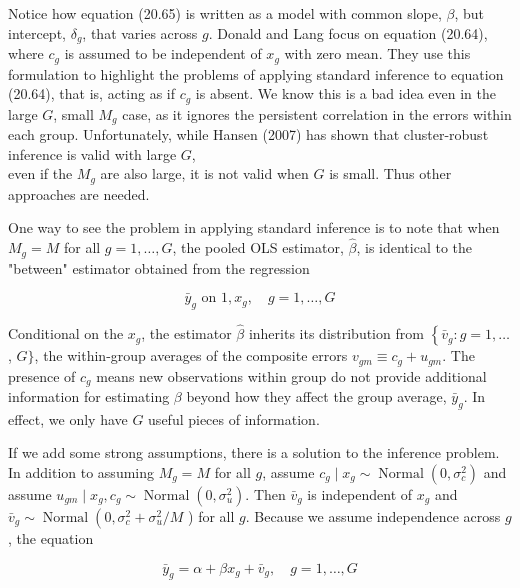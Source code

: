 \documentclass[10pt]{article}
\begin{document}
Notice how equation (20.65) is written as a model with common slope, $\beta$, but intercept, $\delta_{g}$, that varies across $g$. Donald and Lang focus on equation (20.64), where $c_{g}$ is assumed to be independent of $x_{g}$ with zero mean. They use this formulation to highlight the problems of applying standard inference to equation (20.64), that is, acting as if $c_{g}$ is absent. We know this is a bad idea even in the large $G$, small $M_{g}$ case, as it ignores the persistent correlation in the errors within each group. Unfortunately, while Hansen (2007) has shown that cluster-robust inference is valid with large $G$,\\
even if the $M_{g}$ are also large, it is not valid when $G$ is small. Thus other approaches are needed.

One way to see the problem in applying standard inference is to note that when $M_{g}=M$ for all $g=1, \ldots, G$, the pooled OLS estimator, $\hat{\beta}$, is identical to the "between" estimator obtained from the regression


\begin{equation*}
\bar{y}_{g} \text { on } 1, x_{g}, \quad g=1, \ldots, G \tag{20.66}
\end{equation*}


Conditional on the $x_{g}$, the estimator $\hat{\beta}$ inherits its distribution from $\left\{\bar{v}_{g}: g=1, \ldots\right.$, $G\}$, the within-group averages of the composite errors $v_{g m} \equiv c_{g}+u_{g m}$. The presence of $c_{g}$ means new observations within group do not provide additional information for estimating $\beta$ beyond how they affect the group average, $\bar{y}_{g}$. In effect, we only have $G$ useful pieces of information.

If we add some strong assumptions, there is a solution to the inference problem. In addition to assuming $M_{g}=M$ for all $g$, assume $c_{g} \mid x_{g} \sim \operatorname{Normal}\left(0, \sigma_{c}^{2}\right)$ and assume $u_{g m} \mid x_{g}, c_{g} \sim \operatorname{Normal}\left(0, \sigma_{u}^{2}\right)$. Then $\bar{v}_{g}$ is independent of $x_{g}$ and $\bar{v}_{g} \sim \operatorname{Normal}\left(0, \sigma_{c}^{2}+\right. \sigma_{u}^{2} / M$ ) for all $g$. Because we assume independence across $g$, the equation


\begin{equation*}
\bar{y}_{g}=\alpha+\beta x_{g}+\bar{v}_{g}, \quad g=1, \ldots, G \tag{20.67}
\end{equation*}
\end{document}
